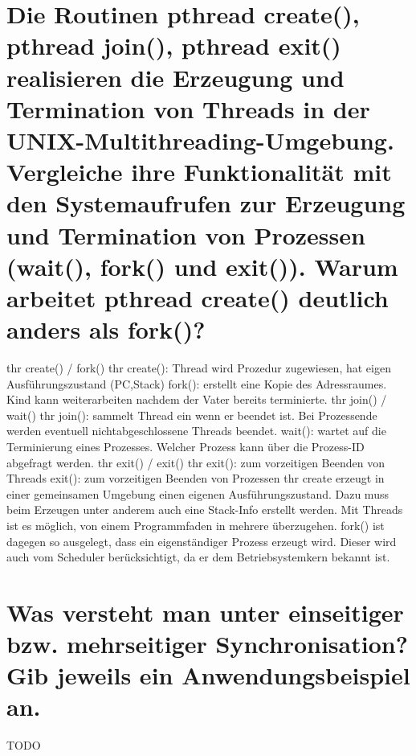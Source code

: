\documentclass[12pt,a4paper,ngerman]{scrartcl}
\newcommand{\question}[1]{#1}
\newenvironment {answer}
                {}
                {}
\begin{document}
\section{\question{Die Routinen pthread create(), pthread join(), pthread exit() realisieren die Erzeugung und Termination von Threads in der UNIX-Multithreading-Umgebung. Vergleiche ihre Funktionalität mit den Systemaufrufen zur Erzeugung und Termination von Prozessen (wait(), fork() und exit()). Warum arbeitet pthread create() deutlich anders als fork()?}}
\begin{answer}
thr create() / fork()
thr create():
Thread wird Prozedur zugewiesen, hat eigen Ausführungszustand (PC,Stack)
fork():
erstellt eine Kopie des Adressraumes. Kind kann weiterarbeiten nachdem der Vater bereits terminierte.
thr join() / wait()
thr join():
sammelt Thread ein wenn er beendet ist. Bei Prozessende werden eventuell nichtabgeschlossene
Threads beendet.
wait():
wartet auf die Terminierung eines Prozesses. Welcher Prozess kann über die Prozess-ID abgefragt
werden.
thr exit() / exit()
thr exit():
zum vorzeitigen Beenden von Threads
exit():
zum vorzeitigen Beenden von Prozessen
thr create erzeugt in einer gemeinsamen Umgebung einen eigenen Ausführungszustand. Dazu muss
beim Erzeugen unter anderem auch eine Stack-Info erstellt werden. Mit Threads ist es möglich,
von einem Programmfaden in mehrere überzugehen. fork() ist dagegen so ausgelegt, dass ein
eigenständiger Prozess erzeugt wird. Dieser wird auch vom Scheduler berücksichtigt, da er dem
Betriebsystemkern bekannt ist.
\end{answer}

\section{\question{Was versteht man unter einseitiger bzw. mehrseitiger Synchronisation? Gib jeweils ein Anwendungsbeispiel an.}}
\begin{answer}
TODO
\end{answer}
\end{document}
